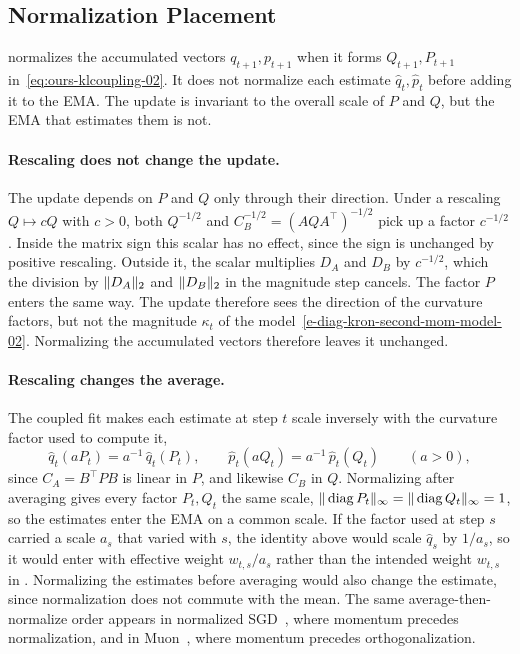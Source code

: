 \subsection{Normalization Placement}
\label{sec:scale-placement-02}
\methodname{} normalizes the accumulated vectors $q_{t+1},p_{t+1}$ when it
forms $Q_{t+1},P_{t+1}$ in~\eqref{eq:ours-klcoupling-02}. It does not
normalize each estimate $\hat{q}_t,\hat{p}_t$ before adding it to the EMA.
The update is invariant to the overall scale of $P$ and $Q$, but the EMA
that estimates them is not.

\paragraph{Rescaling does not change the update.} The update depends on
$P$ and $Q$ only through their direction. Under a rescaling $Q\mapsto cQ$ with
$c>0$, both $Q^{-1/2}$ and $C_B^{-1/2}=(AQA^\top)^{-1/2}$ pick up a factor
$c^{-1/2}$. Inside the matrix sign this scalar has no effect, since the sign
is unchanged by positive rescaling. Outside it, the scalar multiplies $D_A$
and $D_B$ by $c^{-1/2}$, which the division by $\| D_A\|_2$ and
$\| D_B\|_2$ in the magnitude step cancels. The factor $P$ enters the same
way. The update therefore sees the direction of the curvature factors, but
not the magnitude $\kappa_t$ of the
model~\eqref{e-diag-kron-second-mom-model-02}. Normalizing the accumulated
vectors therefore leaves it unchanged.

\paragraph{Rescaling changes the average.} The coupled fit makes each
estimate at step $t$ scale inversely with the curvature factor used to compute it,
\[
  \hat{q}_t(aP_t)=a^{-1}\,\hat{q}_t(P_t),
  \qquad
  \hat{p}_t(aQ_t)=a^{-1}\,\hat{p}_t(Q_t)
  \qquad(a>0),
\]
since $C_A=B^\top PB$ is linear in $P$, and likewise $C_B$ in $Q$.
Normalizing after averaging gives every factor $P_t,Q_t$ the same scale,
$\| \operatorname{diag} P_t\|_\infty=\| \operatorname{diag} Q_t\|_\infty=1$, so the estimates enter
the EMA on a common scale. If the factor used at step $s$
carried a scale $a_s$ that varied with $s$, the identity above would scale
$\hat{q}_s$ by $1/a_s$, so it would enter with effective weight
$w_{t,s}/a_s$ rather than the intended weight $w_{t,s}$ in
. Normalizing the estimates before
averaging would also change the estimate, since normalization does not
commute with the mean. The same average-then-normalize order appears in
normalized SGD~\cite{cutkosky_nigt}, where momentum precedes normalization,
and in Muon~\cite{denoise_ortho}, where momentum precedes orthogonalization.
